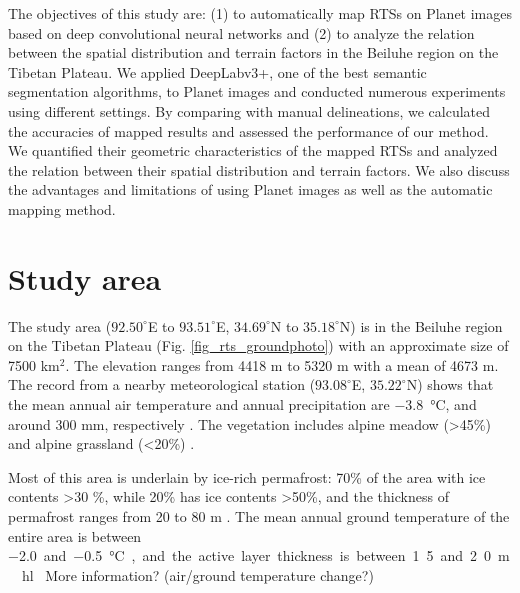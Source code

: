 \documentclass[preprint,12pt,authoryear]{elsarticle}
\begin{document}
The objectives of this study are: (1) to automatically map RTSs on Planet images based on deep convolutional neural networks and (2) to analyze the relation between the spatial distribution and terrain factors in the Beiluhe region on the Tibetan Plateau. We applied DeepLabv3+, one of the best semantic segmentation algorithms, to Planet images and conducted numerous experiments using different settings. By comparing with manual delineations, we calculated the accuracies of mapped results and assessed the performance of our method. We quantified their geometric characteristics of the mapped RTSs and analyzed the relation between their spatial distribution and terrain factors. We also discuss the advantages and limitations of using Planet images as well as the automatic mapping method. 


\section{Study area}
\label{sec_studyarea}
The study area ($92.50^\circ$E to $93.51^\circ$E, $34.69^\circ$N to $35.18^\circ$N) is in the Beiluhe region on the Tibetan Plateau (Fig. \ref{fig_rts_groundphoto}) with an approximate size of 7500 km$^2$. The elevation ranges from 4418 m to 5320 m with a mean of 4673 m. The record from a nearby meteorological station ($93.08^\circ$E, $35.22^\circ$N) shows that the mean annual air temperature and annual precipitation are \SI{-3.8}{\celsius}, and around 300 mm, respectively \citep{luo_thermokarst_2015}. The vegetation includes alpine meadow (\textgreater 45\%) and alpine grassland (\textless 20\%) \citep{luo_thermokarst_2015}. 

Most of this area is underlain by ice-rich permafrost: 70\% of the area with ice contents \textgreater 30 \%, while 20\% has ice contents \textgreater 50\%, and the thickness of permafrost ranges from 20 to 80 m \citep{zhou_geocryology_2000, luo_thermokarst_2015}. The mean annual ground temperature of the entire area is between \SI{-2.0} and \SI{-0.5}{\celsius}, and the active layer thickness is between 1.5 and 2.0 m \citep{zhou_geocryology_2000, luo_thermokarst_2015, wu2010changes, wu2015changes}. \hl{ More information? (air/ground temperature change?)}  %
\end{document}
